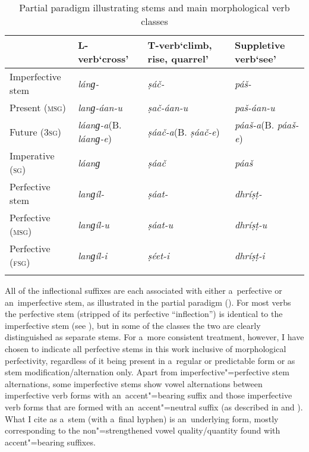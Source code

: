 \begin{table}[ht]
\caption{Partial paradigm illustrating stems and main morphological verb classes}

\begin{tabularx}{\textwidth}{ l P{20mm} Q P{27mm} }
\lsptoprule
& L-verb\newline `cross' &
T-verb\newline `climb, rise, quarrel' &
Suppletive verb\newline `see'\\\hline
Imperfective stem &
\textit{lánɡ-} &
\textit{ṣáč-} &
\textit{páš-} \\
Present (\textsc{msg}) &
\textit{lanɡ-áan-u} &
\textit{ṣač-áan-u} &
\textit{paš-áan-u} \\
Future (\textsc{3sg}) &
\textit{láanɡ-a}\newline (B. \textit{láanɡ-e}) &
\textit{ṣáač-a}\newline (B. \textit{ṣáač-e}) &
\textit{páaš-a}\newline (B. \textit{páaš-e}) \\
Imperative (\textsc{sg}) &
\textit{láanɡ} &
\textit{ṣáač} &
\textit{páaš} \\
Perfective stem &
\textit{lanɡíl-} &
\textit{ṣáat-} &
\textit{dhríṣṭ-} \\
Perfective (\textsc{msg}) &
\textit{lanɡíl-u} &
\textit{ṣáat-u} &
\textit{dhríṣṭ-u} \\
Perfective (\textsc{fsg}) &
\textit{lanɡíl-i} &
\textit{ṣéet-i} &
\textit{dhríṣṭ-i} \\\lspbottomrule
\end{tabularx}
\label{tab:8-3}
\end{table}


All of the inflectional suffixes are each associated with either a~perfective or an~imperfective
stem, as illustrated in the partial paradigm (). For most verbs the perfective stem
(stripped of its perfective ``inflection'') is identical to the imperfective stem (see ), but
in some of the classes the two are clearly distinguished as separate stems. For a~more consistent
treatment, however, I have chosen to indicate all perfective stems in this work inclusive of
morphological perfectivity, regardless of it being present in a~regular or predictable form or as
stem modification/alternation only. Apart from imperfective"=perfective stem alternations, some
imperfective stems show vowel alternations between imperfective verb forms with an~accent"=bearing
suffix and those imperfective verb forms that are formed with an~accent"=neutral suffix (as described
in  and ). What I cite as a~stem (with a~final hyphen) is an~underlying form, mostly
corresponding to the non"=strengthened vowel quality/quantity found with accent"=bearing suffixes.


